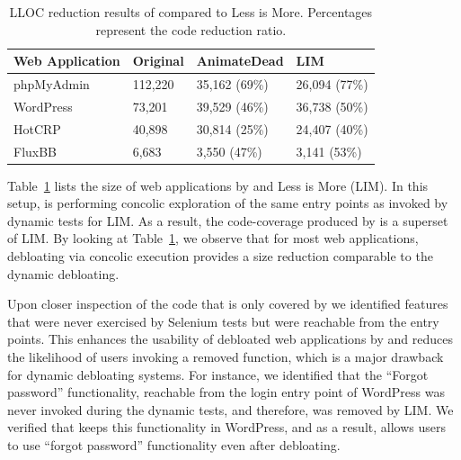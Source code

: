 {\begin{table}[]
    \caption{LLOC reduction results of \animatedead{} compared to Less is More. Percentages represent the code reduction ratio.}
    \label{tab:lloc_reduction}
    \centering
    \begin{adjustbox}{max width=\columnwidth}
        \begin{tabular}{|l|l|l|l|}
        \hline
        \textbf{Web Application} & \textbf{Original} & \textbf{AnimateDead} & \textbf{LIM}  \\ \hline
        phpMyAdmin               & 112,220           & 35,162 (69\%)        & 26,094 (77\%) \\ \hline
        WordPress                & 73,201            & 39,529 (46\%)        & 36,738 (50\%) \\ \hline
        HotCRP                   & 40,898            & 30,814 (25\%)        & 24,407 (40\%) \\ \hline
        FluxBB                   & 6,683             & 3,550 (47\%)         & 3,141 (53\%)  \\ \hline
        \end{tabular}
    \end{adjustbox}
\end{table}

Table~\ref{tab:lloc_reduction} lists the size of web applications by \animatedead{} and Less is More (LIM). 
In this setup, \animatedead{} is performing concolic exploration of the same entry points as invoked by dynamic tests for LIM. 
As a result, the code-coverage produced by \animatedead{} is a superset of LIM. 
By looking at Table~\ref{tab:lloc_reduction}, we observe that for most web applications, debloating via concolic execution provides a size reduction comparable to the dynamic debloating. 


Upon closer inspection of the code that is only covered by \animatedead{} we identified features that were never exercised by Selenium tests but were reachable from the entry points. 
This enhances the usability of debloated web applications by \animatedead{} and reduces the likelihood of users invoking a removed function, which is a major drawback for dynamic debloating systems. 
For instance, we identified that the ``Forgot password'' functionality, reachable from the login entry point of WordPress was never invoked during the dynamic tests, and therefore, was removed by LIM. 
We verified that \animatedead{} keeps this functionality in WordPress, and as a result, allows users to use ``forgot password'' functionality even after debloating. 

}
